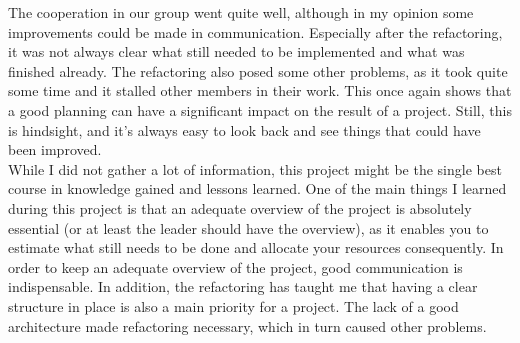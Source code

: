 The cooperation in our group went quite well, although in my opinion some improvements could be made in communication. Especially after the refactoring, it was not always clear what still needed to be implemented and what was finished already. The refactoring also posed some other problems, as it took quite some time and it stalled other members in their work. This once again shows that a good planning can have a significant impact on the result of a project. Still, this is hindsight, and it's always easy to look back and see things that could have been improved.\\

While I did not gather a lot of information, this project might be the single best course in knowledge gained and lessons learned. One of the main things I learned during this project is that an adequate overview of the project is absolutely essential (or at least the leader should have the overview), as it enables you to estimate what still needs to be done and allocate your resources consequently. In order to keep an adequate overview of the project, good communication is indispensable. In addition, the refactoring has taught me that having a clear structure in place is also a main priority for a project. The lack of a good architecture made refactoring necessary, which in turn caused other problems.\\